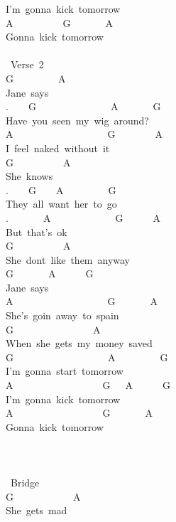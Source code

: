 {I'm\ gonna\ kick\ tomorrow\\
A\ \ \ \ \ \ \ \ \ \ G\ \ \ \ \ \ \ A\\
Gonna\ kick\ tomorrow\\
\\
\lbrack\ Verse\ 2\rbrack\\
G\ \ \ \ \ \ \ \ \ A\\
Jane\ says\\
.\ \ \ \ G\ \ \ \ \ \ \ \ \ \ \ \ \ \ \ A\ \ \ \ \ \ \ G\\
Have\ you\ seen\ my\ wig\ around?\\
A\ \ \ \ \ \ \ \ \ \ \ \ \ \ \ \ \ \ \ G\ \ \ \ \ \ \ \ A\\
I\ feel\ naked\ without\ it\\
G\ \ \ \ \ \ \ \ \ \ A\\
She\ knows\\
.\ \ \ \ G\ \ \ \ A\ \ \ \ \ \ \ \ \ G\\
They\ all\ want\ her\ to\ go\\
.\ \ \ \ \ \ \ A\ \ \ \ \ \ \ \ \ \ \ \ \ G\ \ \ \ \ \ A\\
But\ that's\ ok\\
G\ \ \ \ \ \ \ \ \ \ A\\
She\ dont\ like\ them\ anyway\\
G\ \ \ \ \ \ \ A\ \ \ \ \ \ G\\
Jane\ says\\
A\ \ \ \ \ \ \ \ \ \ \ \ \ \ \ \ \ \ \ G\ \ \ \ \ \ \ A\\
She's\ goin\ away\ to\ spain\\
G\ \ \ \ \ \ \ \ \ \ \ \ \ \ \ \ A\ \\
When\ she\ gets\ my\ money\ saved\\
G\ \ \ \ \ \ \ \ \ \ \ \ \ \ \ \ \ \ \ A\ \ \ \ \ \ \ \ \ G\\
I'm\ gonna\ start\ tomorrow\\
A\ \ \ \ \ \ \ \ \ \ \ \ \ \ \ \ \ \ G\ \ \ A\ \ \ \ \ \ G\\
I'm\ gonna\ kick\ tomorrow\\
A\ \ \ \ \ \ \ \ \ \ \ \ \ \ \ \ \ \ G\ \ \ \ \ \ \ A\\
Gonna\ kick\ tomorrow\\
\\
\\
\\
\lbrack\ Bridge\rbrack\\
G\ \ \ \ \ \ \ \ \ \ \ \ A\\
She\ gets\ mad\\
}
